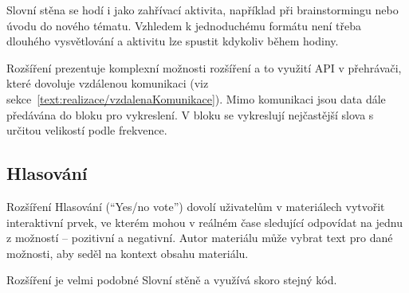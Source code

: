 Slovní stěna se hodí i jako zahřívací aktivita, například při brainstormingu nebo úvodu do nového tématu. 
Vzhledem k jednoduchému formátu není třeba dlouhého vysvětlování a aktivitu lze spustit kdykoliv během hodiny.

Rozšíření prezentuje komplexní možnosti rozšíření a to využití API v přehrávači, které dovoluje vzdálenou komunikaci (viz sekce~\ref{text:realizace/vzdalenaKomunikace}).
Mimo komunikaci jsou data dále předávána do bloku pro vykreslení.
V bloku se vykreslují nejčastější slova s určitou velikostí podle frekvence.


\subsection{Hlasování}

Rozšíření Hlasování (\enquote{Yes/no vote}) dovolí uživatelům v materiálech vytvořit interaktivní prvek, ve kterém mohou v reálném čase sledující odpovídat na jednu z možností -- pozitivní a negativní.
Autor materiálu může vybrat text pro dané možnosti, aby seděl na kontext obsahu materiálu.

Rozšíření je velmi podobné Slovní stěně a využívá skoro stejný kód.
